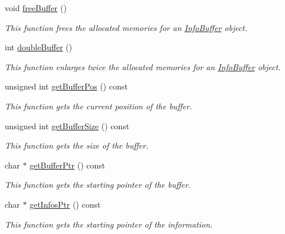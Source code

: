 \begin{CompactItemize}
void \hyperlink{classkmaOrange_1_1InfoBuffer_b68630dc3da3bc27c8b6d2304745449b}{freeBuffer} ()
\begin{CompactList}\small\item\em This function frees the allocated memories for an \hyperlink{classkmaOrange_1_1InfoBuffer}{InfoBuffer} object. \item\end{CompactList}\item 
int \hyperlink{classkmaOrange_1_1InfoBuffer_b8e1043fab6bd103c4cbcbd29aa0a348}{doubleBuffer} ()
\begin{CompactList}\small\item\em This function enlarges twice the allocated memories for an \hyperlink{classkmaOrange_1_1InfoBuffer}{InfoBuffer} object. \item\end{CompactList}\item 
unsigned int \hyperlink{classkmaOrange_1_1InfoBuffer_3939b3c0cc62f4d21fda540e1a6b2142}{getBufferPos} () const 
\begin{CompactList}\small\item\em This function gets the current position of the buffer. \item\end{CompactList}\item 
unsigned int \hyperlink{classkmaOrange_1_1InfoBuffer_b031f0f097be5250b9133aeac71c2504}{getBufferSize} () const 
\begin{CompactList}\small\item\em This function gets the size of the buffer. \item\end{CompactList}\item 
char $\ast$ \hyperlink{classkmaOrange_1_1InfoBuffer_493b3235a28c09c017b00c7bf43b97b5}{getBufferPtr} () const 
\begin{CompactList}\small\item\em This function gets the starting pointer of the buffer. \item\end{CompactList}\item 
char $\ast$ \hyperlink{classkmaOrange_1_1InfoBuffer_acc36dd8a12545210bf5f53cb4ab77ed}{getInfosPtr} () const 
\begin{CompactList}\small\item\em This function gets the starting pointer of the information. \item\end{CompactList}\item 

\end{CompactItemize}
